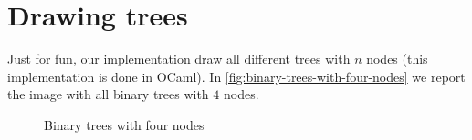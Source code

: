 \section{Drawing trees}

Just for fun, our implementation draw all different trees with $n$
nodes (this implementation is done in OCaml). In
\autoref{fig:binary-trees-with-four-nodes} we report the image with
all binary trees with $4$ nodes.
\begin{figure}[htb]
  \centering
  \caption{Binary trees with four nodes}
  \label{fig:binary-trees-with-four-nodes}
\end{figure}
